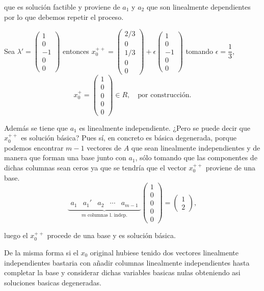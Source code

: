 \begin{solucion}
que es solución factible y proviene de $a_1$ y $a_2$ que son linealmente dependientes por lo que  debemos repetir el proceso.

Sea $\lambda'=\left(
\begin{array}{r}
1\\0\\-1\\0\\0
\end{array}
\right)$ entonces $x_0^{++}=\left(\begin{array}{c}
2/3\\0\\1/3\\0\\0
\end{array}\right)+\epsilon\left(
\begin{array}{r}
1\\0\\-1\\0\\0
\end{array}
\right)$ tomando $\epsilon=\dfrac{1}{3}$,
$$x_0^+=\left(\begin{array}{c}
1\\0\\0\\0\\0
\end{array}\right)\in R,\quad\text{por construcción.}$$

Además se tiene que $a_1$ es linealmente independiente. ¿Pero se puede decir que $x_0^{++}$ es solución básica? Pues sí, en concreto es básica degenerada, porque podemos encontrar $m-1$ vectores de $A$ que sean linealmente independientes y de manera que forman una base junto con $a_1$, sólo tomando que las componentes de dichas columnas sean ceros ya que se tendría que el vector $x_0^{++}$ proviene de una base.
$$\underbrace{\begin{array}{c|cccc}
a_1 & a_1' & a_2 & \cdots & a_{m-1}
\end{array}}_{\text{$m$ columnas l. indep.}}\left(
\begin{array}{c}
1\\0\\0\\0\\0
\end{array}
\right)=\left(
\begin{array}{c}
1\\2
\end{array}\right),$$

luego el $x_0^{++}$ procede de una base y es solución básica.

De la misma forma si el $x_0$ original hubiese tenido dos vectores linealmente independientes bastaria con añadir columnas linealmente independientes hasta completar la base y considerar dichas variables basicas nulas obteniendo asi soluciones basicas degeneradas.
\end{solucion}

